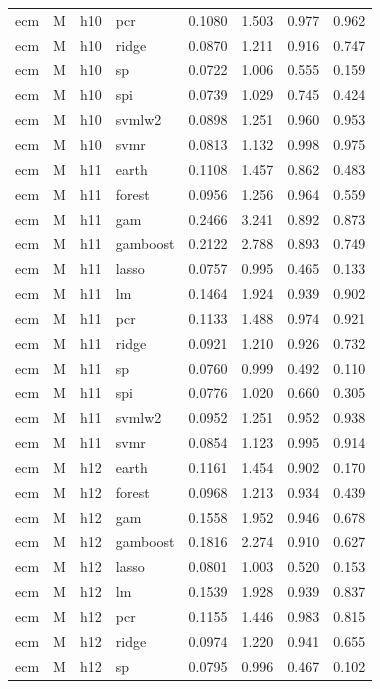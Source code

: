 \begin{ThreePartTable}
\begin{longtable}[t]{llclcccc}
ecm & M & h10 & pcr & 0.1080 & 1.503 & 0.977 & 0.962\\
ecm & M & h10 & ridge & 0.0870 & 1.211 & 0.916 & 0.747\\
ecm & M & h10 & sp & 0.0722 & 1.006 & 0.555 & 0.159\\
ecm & M & h10 & spi & 0.0739 & 1.029 & 0.745 & 0.424\\
ecm & M & h10 & svmlw2 & 0.0898 & 1.251 & 0.960 & 0.953\\
ecm & M & h10 & svmr & 0.0813 & 1.132 & 0.998 & 0.975\\
\addlinespace
ecm & M & h11 & earth & 0.1108 & 1.457 & 0.862 & 0.483\\
ecm & M & h11 & forest & 0.0956 & 1.256 & 0.964 & 0.559\\
ecm & M & h11 & gam & 0.2466 & 3.241 & 0.892 & 0.873\\
ecm & M & h11 & gamboost & 0.2122 & 2.788 & 0.893 & 0.749\\
ecm & M & h11 & lasso & 0.0757 & 0.995 & 0.465 & 0.133\\
ecm & M & h11 & lm & 0.1464 & 1.924 & 0.939 & 0.902\\
ecm & M & h11 & pcr & 0.1133 & 1.488 & 0.974 & 0.921\\
ecm & M & h11 & ridge & 0.0921 & 1.210 & 0.926 & 0.732\\
ecm & M & h11 & sp & 0.0760 & 0.999 & 0.492 & 0.110\\
ecm & M & h11 & spi & 0.0776 & 1.020 & 0.660 & 0.305\\
ecm & M & h11 & svmlw2 & 0.0952 & 1.251 & 0.952 & 0.938\\
ecm & M & h11 & svmr & 0.0854 & 1.123 & 0.995 & 0.914\\
\addlinespace
ecm & M & h12 & earth & 0.1161 & 1.454 & 0.902 & 0.170\\
ecm & M & h12 & forest & 0.0968 & 1.213 & 0.934 & 0.439\\
ecm & M & h12 & gam & 0.1558 & 1.952 & 0.946 & 0.678\\
ecm & M & h12 & gamboost & 0.1816 & 2.274 & 0.910 & 0.627\\
ecm & M & h12 & lasso & 0.0801 & 1.003 & 0.520 & 0.153\\
ecm & M & h12 & lm & 0.1539 & 1.928 & 0.939 & 0.837\\
ecm & M & h12 & pcr & 0.1155 & 1.446 & 0.983 & 0.815\\
ecm & M & h12 & ridge & 0.0974 & 1.220 & 0.941 & 0.655\\
ecm & M & h12 & sp & 0.0795 & 0.996 & 0.467 & 0.102\\

\end{longtable}
\end{ThreePartTable}
